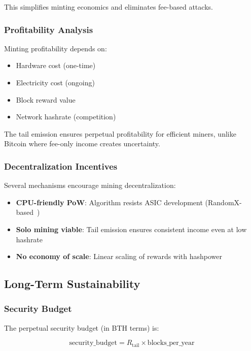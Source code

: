 This simplifies minting economics and eliminates fee-based attacks.

\subsubsection{Profitability Analysis}

Minting profitability depends on:
\begin{itemize}
  \item Hardware cost (one-time)
  \item Electricity cost (ongoing)
  \item Block reward value
  \item Network hashrate (competition)
\end{itemize}

The tail emission ensures perpetual profitability for efficient miners,
unlike Bitcoin where fee-only income creates uncertainty.

\subsubsection{Decentralization Incentives}

Several mechanisms encourage mining decentralization:

\begin{itemize}
  \item \textbf{CPU-friendly PoW}: Algorithm resists ASIC development
    (RandomX-based~\cite{randomx})
  \item \textbf{Solo mining viable}: Tail emission ensures consistent
    income even at low hashrate
  \item \textbf{No economy of scale}: Linear scaling of rewards with
    hashpower
\end{itemize}

\subsection{Long-Term Sustainability}

\subsubsection{Security Budget}

The perpetual security budget (in BTH terms) is:

\begin{equation}
\text{security\_budget} = R_{\text{tail}} \times \text{blocks\_per\_year}
\end{equation}

